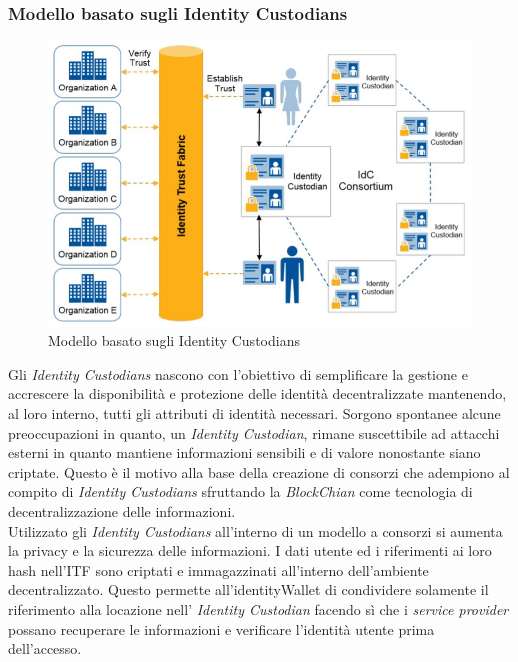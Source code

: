 \subsubsection{Modello basato sugli Identity Custodians}
\begin{figure}[!h]
	\centering
	\includegraphics[scale=0.50]{immagini/ITF_IdentityCustodians}
	\caption{Modello basato sugli Identity Custodians}
\end{figure}
Gli \textit{Identity Custodians} nascono con l'obiettivo di semplificare la gestione e accrescere la disponibilità e protezione delle identità decentralizzate mantenendo, al loro interno, tutti gli attributi di identità necessari.
Sorgono spontanee alcune preoccupazioni in quanto, un \textit{Identity Custodian}, rimane suscettibile ad attacchi esterni in quanto mantiene informazioni sensibili e di valore nonostante siano criptate. Questo è il motivo alla base della creazione di consorzi che adempiono al compito di \textit{Identity Custodians} sfruttando la \textit{BlockChian} come tecnologia di decentralizzazione delle informazioni.\\
Utilizzato gli \textit{Identity Custodians} all'interno di un modello a consorzi si aumenta la privacy e la sicurezza delle informazioni. I dati utente ed i riferimenti ai loro hash nell'\gls{ITF} sono criptati e immagazzinati all'interno dell'ambiente decentralizzato. Questo permette all'\gls{identityWallet} di condividere solamente il riferimento alla locazione nell' \textit{Identity Custodian} facendo sì che i \textit{service provider} possano recuperare le informazioni e verificare l'identità utente prima dell'accesso\cite{ITF_gartner}.\\

